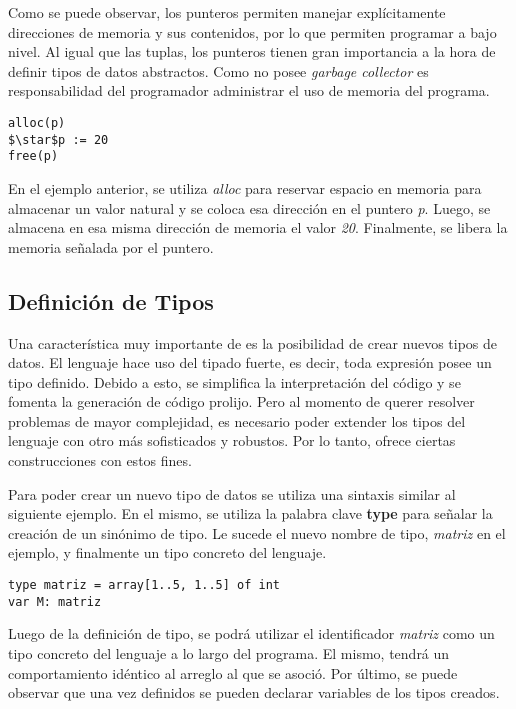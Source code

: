 \documentclass{article}
\begin{document}
Como se puede observar, los punteros permiten manejar explícitamente direcciones de memoria y sus contenidos, por lo que permiten programar a bajo nivel.
Al igual que las tuplas, los punteros tienen gran importancia a la hora de definir tipos de datos abstractos.
Como \Lang\space no posee \textit{garbage collector} es responsabilidad del programador administrar el uso de memoria del programa.

\begin{lstlisting}
alloc(p)
$\star$p := 20
free(p)
\end{lstlisting}

En el ejemplo anterior, se utiliza \textit{alloc} para reservar espacio en memoria para almacenar un valor natural y se coloca esa dirección en el puntero \textit{p}.
Luego, se almacena en esa misma dirección de memoria el valor \textit{20}.
Finalmente, se libera la memoria señalada por el puntero.

\subsection{Definición de Tipos}

Una característica muy importante de \Lang\space es la posibilidad de crear nuevos tipos de datos.
El lenguaje hace uso del tipado fuerte, es decir, toda expresión posee un tipo definido.
Debido a esto, se simplifica la interpretación del código y se fomenta la generación de código prolijo.
Pero al momento de querer resolver problemas de mayor complejidad, es necesario poder extender los tipos del lenguaje con otro más sofisticados y robustos.
Por lo tanto, \Lang\space ofrece ciertas construcciones con estos fines.

Para poder crear un nuevo tipo de datos se utiliza una sintaxis similar al siguiente ejemplo.
En el mismo, se utiliza la palabra clave \textbf{type} para señalar la creación de un sinónimo de tipo.
Le sucede el nuevo nombre de tipo, \textit{matriz} en el ejemplo, y finalmente un tipo concreto del lenguaje.

\begin{lstlisting}
type matriz = array[1..5, 1..5] of int
var M: matriz
\end{lstlisting}

Luego de la definición de tipo, se podrá utilizar el identificador \textit{matriz} como un tipo concreto del lenguaje a lo largo del programa.
El mismo, tendrá un comportamiento idéntico al arreglo al que se asoció.
Por último, se puede observar que una vez definidos se pueden declarar variables de los tipos creados.
\end{document}
